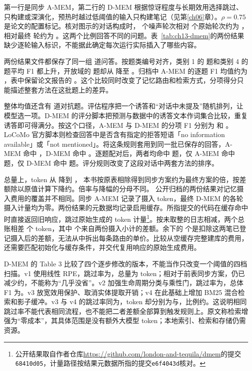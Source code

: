 \begin{sloppypar}
第一行是同步 A-MEM，第二行的 D-MEM 根据惊讶程度与长期效用选择跳过、只构建或深演化，预热时越过低阈值的输入只构建笔记（见第\ref{ch06}章）。$\rho=0.75$ 是论文的配置标记。核对图示的对话构成时， 个噪声轮次相对  个原始轮次约为 ，相对最终  轮约为 。这两个比例回答不同的问题。表~\ref{tab:ch13-dmem}的两份结果缺少逐轮输入标识，不能据此确定每次运行实际插入了哪些内容。

两份结果文件都保存了同一组  道问答。按题类编号对齐，类别 1 的  题和类别 4 的  题平均 F1 都上升，开放域的  题却从  降至 。归档中 A-MEM 的逐题 F1 均值约为 ，表中保留论文报告的 。这个比较同时改变了记忆路由和检索方式，分项得分只能描述整套方法在这批题上的差异。

整体均值还含有  道对抗题。评估程序把一个诱答和“对话中未提及”随机排列，让模型选一项。D-MEM 的评分脚本把预测与数据中的诱答文本作词集合比较，重复诱答即可得满分。按这个口径，A-MEM 与 D-MEM 的分项 F1 分别为  和 。LoCoMo 官方脚本则检查回答中是否含有指定的拒答短语「no information available」或「not mentioned」\cite{locomo-acl-2024}。将这条规则套用到同一批已保存的回答，A-MEM 命中 ，D-MEM 命中 。逐题配对后，两者均命中  题，仅 A-MEM 命中  题，仅 D-MEM 命中  题。评分规则改变了这段对话中两套方法的排序。

总量上，token 从  降到 ，
本书按原表相除得到同步方案约为最终方案的倍，按差额除以原值计算下降约。倍率与降幅的分母不同。
公开归档的两份结果对记忆摄入费用的覆盖并不相同。同步 A-MEM 记录了摄入 token，最终 D-MEM 的各轮摄入计量均为零。两份结果的元数据均记录启用缓存。所指提交的代码在缓存命中时直接返回旧响应，跳过原始生成的 token 计量\footnote{公开结果取自作者仓库\url{https://github.com/london-and-tequila/dmem}的提交\texttt{68410d05}，计量路径按结果元数据所指的提交\texttt{e6f4043d}核对。}。按未取整的日志相减，两个总账相差  个 token，其中  个来自两份摄入小计的差额。余下的  个是扣除这两笔已登记摄入后的差额，无法从中拆出每条路由的单价。比较从空缓存完整建库的费用，还需要匹配初始化与缓存条件，并交代复用响应的原始生成费用。
\end{sloppypar}

\begin{sloppypar}
D-MEM 的 Table 3 比较了四个逐步修改的版本，不能当作只改变一个阈值的四档扫描。v1 使用线性 RPE，跳过率为，总量为 token；相对于前表同步方案，仍已减少约，不能称为“几乎没省”。v2 加强生命周期分类与乘性门，跳过率为，总体 F1 为。v3 放宽效用保护、取消实体提取开销；v4 在此基础上增加 BM25 混合检索和影子缓冲。v3 与 v4 的跳过率同为，token 却分别为与，比例约。这说明相同跳过率不能代表相同流程，也不能把二者差额全部算到触发规则上。原文称检索增强为“零成本”，其具体范围是没有额外大模型 token；本地索引、检索和存储仍需资源\cite{dmem-2603}。
\end{sloppypar}

